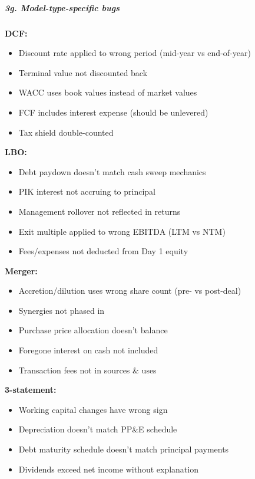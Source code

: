 \documentclass[11pt]{article}
\begin{document}
\subparagraph{3g. Model-type-specific bugs}\mbox{}\par

\textbf{DCF:}

\begin{itemize}[leftmargin=*,itemsep=2pt,topsep=2pt]
\item {} Discount rate applied to wrong period (mid-year vs end-of-year)
\item {} Terminal value not discounted back
\item {} WACC uses book values instead of market values
\item {} FCF includes interest expense (should be unlevered)
\item {} Tax shield double-counted
\end{itemize}

\textbf{LBO:}

\begin{itemize}[leftmargin=*,itemsep=2pt,topsep=2pt]
\item {} Debt paydown doesn't match cash sweep mechanics
\item {} PIK interest not accruing to principal
\item {} Management rollover not reflected in returns
\item {} Exit multiple applied to wrong EBITDA (LTM vs NTM)
\item {} Fees/expenses not deducted from Day 1 equity
\end{itemize}

\textbf{Merger:}

\begin{itemize}[leftmargin=*,itemsep=2pt,topsep=2pt]
\item {} Accretion/dilution uses wrong share count (pre- vs post-deal)
\item {} Synergies not phased in
\item {} Purchase price allocation doesn't balance
\item {} Foregone interest on cash not included
\item {} Transaction fees not in sources \& uses
\end{itemize}

\textbf{3-statement:}

\begin{itemize}[leftmargin=*,itemsep=2pt,topsep=2pt]
\item {} Working capital changes have wrong sign
\item {} Depreciation doesn't match PP\&E schedule
\item {} Debt maturity schedule doesn't match principal payments
\item {} Dividends exceed net income without explanation
\end{itemize}
\end{document}
